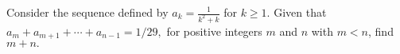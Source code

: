Consider the sequence defined by $a_k=\frac 1{k^2+k}$ for $k\ge 1.$  Given that $a_m+a_{m+1}+\cdots+a_{n-1}=1/29,$ for positive integers $m$ and $n$ with $m<n$, find $m+n.$
